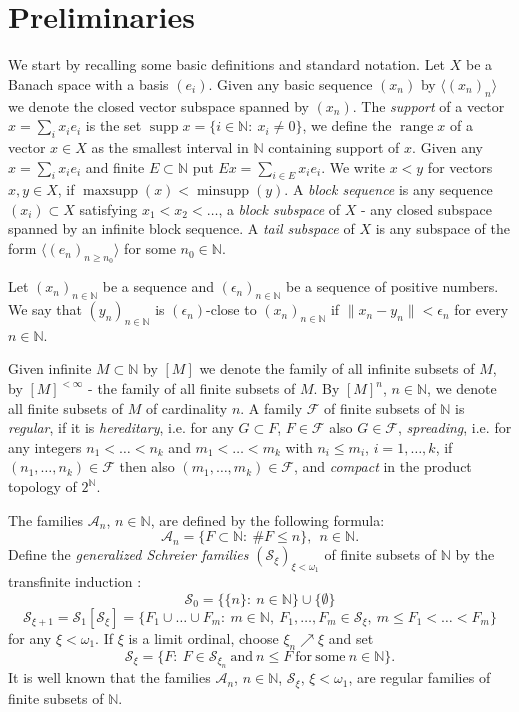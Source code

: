 \documentclass[a4paper]{amsart}
\theoremstyle{plain}
\newcommand{\N}{\mathbb{N}}
\newcommand{\mc}{\mathcal}
\newcommand{\e}{\epsilon}
\newcommand{\norm}[1][\cdot]{\lVert #1\rVert}
\DeclareMathOperator{\minsupp}{minsupp}
\DeclareMathOperator{\maxsupp}{maxsupp}
\DeclareMathOperator{\supp}{supp}
\DeclareMathOperator{\ran}{range}
\begin{document}
\section{Preliminaries}\label{sec2}
We start by recalling  some basic definitions and standard
notation. Let $X$ be a Banach space with a basis $(e_i)$. Given
any basic sequence $(x_n)$ by $\langle (x_n)_n\rangle$ we denote the closed vector
subspace spanned by $(x_n)$. The \textit{support} of a vector
$x=\sum_i x_i e_i$ is the set $\supp x =\{ i\in\N :\ x_i\neq 0\}$,
we define the $\ran x$ of a vector $x\in X$ as the smallest
interval in $\N$ containing support of $x$. Given any $x=\sum_i
x_ie_i$ and finite $E\subset\N$ put $Ex=\sum_{i\in E}x_ie_i$. We
write $x<y$ for vectors $x,y\in X$, if $\maxsupp (x)<\minsupp(
y)$. A \textit{block sequence} is any sequence $(x_i)\subset X$
satisfying $x_{1}<x_{2}<\dots$, a \textit{block subspace} of $X$ -
any closed subspace spanned by an infinite block sequence. A
\textit{tail subspace} of $X$ is any subspace of the form
$\langle (e_n)_{n\geq n_0}\rangle$ for some $n_0\in\N$.


Let  $(x_n)_{n\in\N}$ be a sequence and $(\e_{n})_{n\in\N}$ be a sequence of positive
numbers. We say that $(y_n)_{n\in\N}$  is $(\e_n)$-close  to $(x_n)_{n\in\N}$ if
$\norm[x_n-y_n]<\e_n$ for every $n\in\N$.

Given infinite $M\subset\N$ by $[M]$ we denote the family of all infinite subsets of $M$,
by $[M]^{<\infty}$ - the family of all finite subsets of $M$. By $[M]^{n}$, $n\in\N$, we denote all finite subsets of $M$ of cardinality $n$. A family $\mc{F}$ of finite
subsets of $\N$ is \textit{regular}, if it is \textit{hereditary}, i.e. for any $G\subset
F$, $F\in \mc{F}$ also $G\in \mc{F}$, \textit{spreading}, i.e. for any integers
$n_1<\dots<n_k$ and $m_1<\dots<m_k$ with $n_i\leq m_i$, $i=1,\dots, k$, if
$(n_1,\dots,n_k)\in \mc{F}$ then also $(m_1,\dots,m_k)\in \mc{F}$, and \textit{compact}
in the product topology of $2^\N$.

The families $\mc{A}_n$, $n\in\N$, are defined by the following formula:
$$
\mc{A}_n=\{F\subset \N:\ \# F\leq n\}, \  \ n\in\N.
$$
Define the \textit{generalized Schreier families} $(\mc{S}_{\xi})_{\xi<\omega_1}$ of
finite subsets of $\N$ by the transfinite induction \cite{AA}:
$$\mc{S}_0=\{\{ n\}:\ n\in\N\}\cup\{\emptyset\}$$
$$\mc{S}_{\xi+1}=\mc{S}_{1}[\mc{S}_{\xi}]=\{ F_1\cup\dots\cup F_m:\ m\in\N,\ F_1,\dots,F_m\in \mc{S}_\xi,\ m\leq F_1<\dots<F_m\}$$
for any $\xi<\omega_1$. If $\xi$ is a limit ordinal, choose
$\xi_n\nearrow \xi$ and set
$$\mc{S}_{\xi}=\{F:\ F\in \mc{S}_{\xi_n}\ \mathrm{and}\ n\leq F\ \mathrm{for\ some}\ n\in\N\}.
$$
It is well known that the families $\mc{A}_n$, $n\in\N$, $\mc{S}_{\xi}$,
$\xi<\omega_{1}$, are regular families of finite subsets of $\N$.
\end{document}
